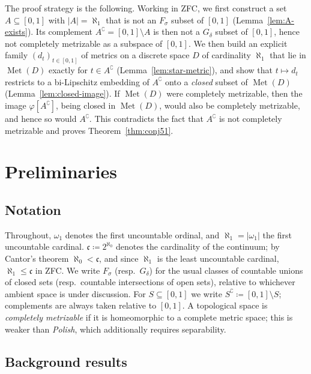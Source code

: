 \documentclass[12pt]{article}
\theoremstyle{definition}
\newcommand{\Met}{\operatorname{Met}}
\newcommand{\Fsigma}{F_{\!\sigma}}
\newcommand{\Gdelta}{G_{\!\delta}}
\newcommand{\Cont}{\mathfrak{c}}
\begin{document}
The proof strategy is the following. Working in ZFC, we first construct
a set $A \subseteq [0,1]$ with
$\lvert A\rvert = \aleph_1$ that is not an $\Fsigma$ subset of $[0,1]$
(Lemma~\ref{lem:A-exists}). Its complement $A^\complement =
[0,1]\setminus A$ is then not a $\Gdelta$ subset of $[0,1]$, hence not
completely metrizable as a subspace of $[0,1]$. We then build an explicit
family $(d_t)_{t\in[0,1]}$ of metrics on a discrete space $D$ of
cardinality $\aleph_1$ that lie in $\Met(D)$ exactly for $t \in
A^\complement$ (Lemma~\ref{lem:star-metric}), and show that $t \mapsto
d_t$ restricts to a bi-Lipschitz embedding of $A^\complement$ onto a
\emph{closed} subset of $\Met(D)$ (Lemma~\ref{lem:closed-image}).
If $\Met(D)$ were completely metrizable, then the image
$\varphi[A^\complement]$, being closed in $\Met(D)$, would also be
completely metrizable, and hence so would $A^\complement$.
This contradicts the fact that $A^\complement$ is not completely
metrizable and proves Theorem~\ref{thm:conj51}.

\section{Preliminaries}
\label{sec:prelim}

\subsection{Notation}

Throughout, $\omega_1$ denotes the first uncountable ordinal, and
$\aleph_1 = \lvert\omega_1\rvert$ the first uncountable cardinal.
$\Cont \coloneqq 2^{\aleph_0}$ denotes the cardinality of the continuum; by
Cantor's theorem $\aleph_0 < \Cont$, and since $\aleph_1$ is the least
uncountable cardinal, $\aleph_1 \le \Cont$ in ZFC.
We write $\Fsigma$ (resp.\ $\Gdelta$) for the usual classes of
countable unions of closed sets (resp.\ countable intersections of open
sets), relative to whichever ambient space is under discussion. For $S
\subseteq [0,1]$ we write $S^\complement \coloneqq [0,1] \setminus S$;
complements are always taken relative to $[0,1]$. A topological space is
\emph{completely metrizable} if it is homeomorphic to a complete metric
space; this is weaker than \emph{Polish}, which additionally requires
separability.

\subsection{Background results}
\label{subsec:background}
\end{document}
